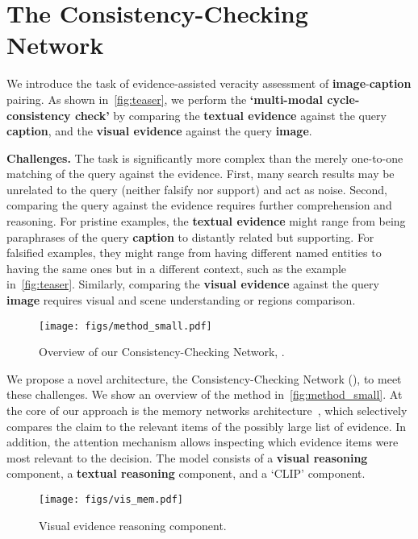 \section{The Consistency-Checking Network}

We introduce the task of evidence-assisted veracity assessment of \textbf{\textcolor{myOrange}{image}}-\textbf{\textcolor{myblue}{caption}} pairing. As shown in~\autoref{fig:teaser}, we perform the \textbf{`multi-modal cycle-consistency check'} by comparing the \textbf{\textcolor{myblue}{textual evidence}} against the query \textbf{\textcolor{myblue}{caption}}, and the \textbf{\textcolor{myOrange}{visual evidence}} against the query \textbf{\textcolor{myOrange}{image}}.

\textbf{Challenges.} The task is significantly more complex than the merely one-to-one matching of the query against the evidence. First, many search results may be  unrelated to the query (neither falsify nor support) and act as noise. Second, comparing the query against the evidence requires further comprehension and reasoning. For pristine examples, the \textbf{\textcolor{myblue}{textual evidence}} might range from being paraphrases of the query \textbf{\textcolor{myblue}{caption}} to distantly related but supporting. For falsified examples, they might range from having different named entities to having the same ones but in a different context, such as the example in~\autoref{fig:teaser}. Similarly, comparing the \textbf{\textcolor{myOrange}{visual evidence}} against the query \textbf{\textcolor{myOrange}{image}} requires visual and scene understanding or regions comparison.
\begin{figure}[!t]
\centering
\texttt{[image: figs/method\_small.pdf]}
\caption{Overview of our Consistency-Checking Network, \model{}.} 
\label{fig:method_small}
\vspace{-3mm}
\end{figure}

We propose a novel architecture, the Consistency-Checking Network (\model{}), to meet these challenges. We show an overview of the method in~\autoref{fig:method_small}. At the core of our approach is the memory networks architecture~\cite{sukhbaatar2015end,kumar2016ask,mohtarami2018automatic,chunseong2017attend}, which selectively compares the claim to the relevant items of the possibly large list of evidence. In addition, the attention mechanism allows inspecting which evidence items were most relevant to the decision. The model consists of a \textbf{\textcolor{myOrange}{visual reasoning}} component, a \textbf{\textcolor{myblue}{textual reasoning}} component, and a `CLIP' component. 
\begin{figure}[!b]
\vspace{-2mm}
\centering
\texttt{[image: figs/vis\_mem.pdf]}
\caption{Visual evidence reasoning component.} 
\label{fig:vis_mem}
\end{figure}


